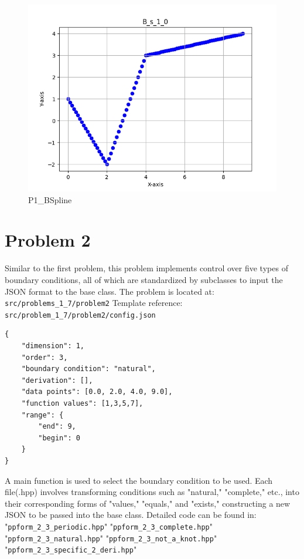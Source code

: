 \documentclass[a4paper]{article}
\begin{document}
\begin{figure}[H] 
    \centering
    \includegraphics{../figure/B_s_1_0.png}
    \caption{P1\_BSpline}
\end{figure}

\section*{Problem 2}
Similar to the first problem, this problem implements control over five types of boundary conditions, all of which are standardized by subclasses to input the JSON format to the base class.
The problem is located at: \texttt{src/problems\_1\_7/problem2}
Template reference: \texttt{src/problem\_1\_7/problem2/config.json}

\begin{verbatim}
{
    "dimension": 1,
    "order": 3,
    "boundary condition": "natural",
    "derivation": [],
    "data points": [0.0, 2.0, 4.0, 9.0],
    "function values": [1,3,5,7],
    "range": {
        "end": 9,
        "begin": 0
    }
}
\end{verbatim}

A main function is used to select the boundary condition to be used. Each file(.hpp) involves transforming conditions such as "natural," "complete," etc., into their corresponding forms of "values," "equals," and "exists," constructing a new JSON to be passed into the base class.
Detailed code can be found in:
"\texttt{ppform\_2\_3\_periodic.hpp}"
"\texttt{ppform\_2\_3\_complete.hpp}"
"\texttt{ppform\_2\_3\_natural.hpp}"
"\texttt{ppform\_2\_3\_not\_a\_knot.hpp}"
"\texttt{ppform\_2\_3\_specific\_2\_deri.hpp}"
\end{document}
